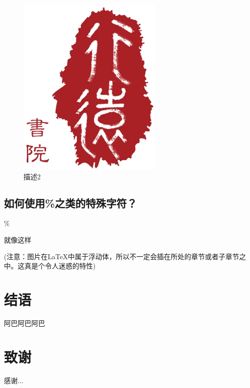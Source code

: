 \documentclass[12pt,a4paper,UTF8]{ctexart}
\begin{document}
\begin{figure}[!htbp]
\begin{minipage}{0.45\textwidth}
        \includegraphics[width=\textwidth]{figures/xylogo_1.png}
        \caption{描述2}
        \label{I4}
    \end{minipage}
\end{figure}


\subsection{如何使用\%之类的特殊字符？}

\%

就像这样

(注意：图片在\LaTeX 中属于浮动体，所以不一定会插在所处的章节或者子章节之中。这真是个令人迷惑的特性)
\section{结语}
阿巴阿巴阿巴

\section{致谢}
感谢...

{}
\end{document}

